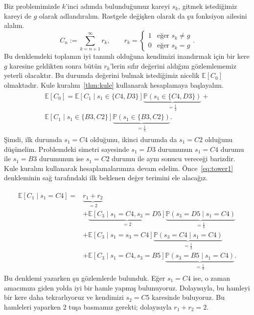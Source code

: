 Biz problemimizde $k$'inci ad{\i}mda bulundu\u{g}umuz kareyi $s_k$, gitmek
istedi\u{g}imiz kareyi de $g$ olarak adland{\i}ral{\i}m. Rastgele
de\u{g}i\c{s}ken olarak da \c{s}u fonksiyon ailesini alal{\i}m.
\begin{equation}
    C_n := \sum_{k=n+1}^\infty r_k, \qquad r_k = 
\begin{cases}
    1 & \mbox{e\u{g}er } s_k \neq g \\
    0 & \mbox{e\u{g}er } s_k = g
\end{cases}.
\label{eq:RVs}
\end{equation}
Bu denklemdeki toplam{\i}n iyi tan{\i}ml{\i} oldu\u{g}una kendimizi
inand{\i}rmak i\c{c}in bir kere $g$ karesine geldikten sonra b\"{u}t\"{u}n
$r_k$'lerin s{\i}f{\i}r de\u{g}erini ald{\i}\u{g}{\i}n{\i} g\"{o}zlemlememiz
yeterli olacakt{\i}r. Bu durumda de\u{g}erini bulmak istedi\u{g}imiz nicelik
$\mathbb{E}[C_0]$ olmaktad{\i}r. Kule kural{\i}n{\i}~\ref{thm:kule} kullanarak
hesaplamaya ba\c{s}layal{\i}m.
%
\begin{align}
    \begin{split}
    \mathbb{E}[C_0] = \mathbb{E}\left[ C_1 \mid s_1 \in \{C4, D3\} \right] 
    \underbrace{\mathbb{P}(s_1 \in \{C4, D3\})}_{=\frac{1}{2}} + \\ 
    \mathbb{E}\left[ C_1 \mid s_1 \in \{B3, C2\} 
    \right] \underbrace{\mathbb{P}(s_1 \in \{B3, C2\})}_{=\frac{1}{2}}.
    \end{split}
    \label{eq:tower1}
\end{align}
%
\c{S}imdi, ilk durumda $s_1 = C4$ oldu\u{g}unu, ikinci durumda da $s_1 = C2$
oldu\u{g}unu d\"{u}\c{s}\"{u}nelim. Problemdeki simetri sayesinde $s_1 = D3$
durumunun $s_1 = C4$ durumu ile $s_1 = B3$ durumunun ise $s_1 = C2$ durumu ile
ayn{\i} sonucu verece\u{g}i barizdir. Kule kural{\i}n{\i} kullanarak
hesaplamalar{\i}m{\i}za devam edelim. \"{O}nce~\eqref{eq:tower1} denkleminin
sa\u{g} taraf{\i}ndaki ilk beklenen de\u{g}er terimini ele alaca\u{g}{\i}z.

\begin{align}
    \begin{split}
    \mathbb{E}\left[ C_1 \mid s_1 = C4 \right] = &\underbrace{r_1 + r_2}_{=2} \\ 
    &+ \underbrace{\mathbb{E}[C_3 \mid s_1 = C4, s_3 = D5]}_{=2} \underbrace{\mathbb{P}(s_3 = D5 \mid s_1 = C4)}_{=\frac{1}{3}} \\
    &+ \mathbb{E}[C_3 \mid s_1 = s_3 = C4] \underbrace{\mathbb{P}(s_3 = C4 \mid s_1 = C4)}_{=\frac{1}{3}} \\
    &+ \mathbb{E}[C_3 \mid s_1 = C4, s_3 = B5] \underbrace{\mathbb{P}(s_3 = B5 \mid s_1 = C4)}_{=\frac{1}{3}}.
    \end{split}
    \label{eq:tower2}
\end{align}
%
Bu denklemi yazarken \c{s}u g\"{o}zlemlerde bulunduk. E\u{g}er $s_1 = C4$ ise, o
zaman amac{\i}m{\i}za giden yolda iyi bir hamle yapm{\i}\c{s} bulunuyoruz.
Dolay{\i}s{\i}yla, bu hamleyi bir kere daha tekrarl{\i}yoruz ve kendimizi $s_2 =
C5$ karesinde buluyoruz. Bu hamleleri yaparken $2$ tu\c{s}a basmam{\i}z gerekti;
dolay{\i}s{\i}yla $r_1 + r_2 = 2$.


